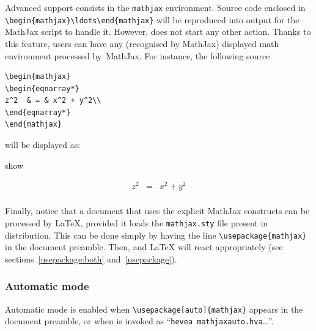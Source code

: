 %
%
Advanced support consists in the \texttt{mathjax} environment. Source code
enclosed in \verb+\begin{mathjax}\ldots\end{mathjax}+ will be
reproduced into output for the \textsf{MathJax} script to handle it.
However, \hevea{} does not start any other action.
Thanks to this feature, users can have any (recognised by \textsf{MathJax})
displayed math environment processed by~\textsf{MathJax}. For instance,
the following source
\begin{verbatim}
\begin{mathjax}
\begin{eqnarray*}
z^2  & = & x^2 + y^2\\
\end{eqnarray*}
\end{mathjax}
\end{verbatim}
will be displayed as:
\begin{divstyle}{show}
\begin{mathjax}
\begin{eqnarray*}
z^2  & = & x^2 + y^2\\
\end{eqnarray*}
\end{mathjax}
\end{divstyle}

Finally, notice that a document that uses the explicit \textsf{MathJax}
constructs can be processed by \LaTeX, provided
it loads the \texttt{mathjax.sty} file present in \hevea{} distribution.
This can be done simply by having the line \verb+\usepackage{mathjax}+ in
the document preamble. Then, \hevea{} and \LaTeX{} will react appropriately
(see sections~\ref{usepackage:both} and~\ref{usepackage}).

\subsubsection{Automatic mode}
%
Automatic mode is enabled when \verb+\usepackage[auto]{mathjax}+
appears in the document preamble,
or when \hevea{} is invoked as ``\verb+hevea mathjaxauto.hva+\ldots''.


